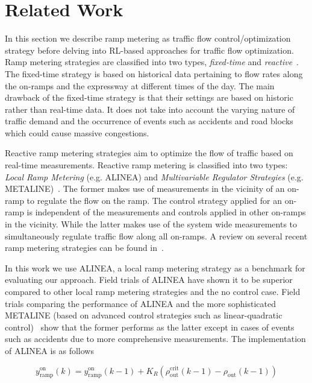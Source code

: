 \documentclass[conference]{IEEEtran}
\begin{document}
\section{Related Work}
\label{sec:rel-work}

In this section we describe ramp metering as traffic flow control/optimization strategy before delving into RL-based approaches for traffic flow optimization. Ramp metering strategies are classified into two types, {\it fixed-time} and {\it reactive}~\cite{papageorgiou2003review}. The fixed-time strategy is based on historical data pertaining to flow rates along the on-ramps and the expressway at different times of the day. The main drawback of the fixed-time strategy is that their settings are based on historic rather than real-time data. It does not take into account the varying nature of traffic demand and the occurrence of events such as accidents and road blocks which could cause massive congestions. 

Reactive ramp metering strategies aim to optimize the flow of traffic based on real-time measurements. Reactive ramp metering is classified into two types: {\it Local Ramp Metering} (e.g. ALINEA) and {\it Multivariable Regulator Strategies} (e.g. METALINE)~\cite{papageorgiou2003review}. The former makes use of measurements in the vicinity of an on-ramp to regulate the flow on the ramp. The control strategy applied for an on-ramp is independent of the measurements and controls applied in other on-ramps in the vicinity. While the latter makes use of the system wide measurements to simultaneously regulate traffic flow along all on-ramps. A review on several recent ramp metering strategies can be found in~\cite{shaaban2016literature}.

In this work we use ALINEA, a local ramp metering strategy as a benchmark for evaluating our approach. Field trials of ALINEA have shown it to be superior compared to other local ramp metering strategies and the no control case. Field trials comparing the performance of ALINEA and the more sophisticated METALINE (based on advanced control strategies such as linear-quadratic control)~\cite{papageorgiou1997alinea} show that the former performs as the latter except in cases of events such as accidents due to more comprehensive measurements. The implementation of ALINEA is as follows

\begin{equation}
\label{eq:alinea}
y^{\text{on}}_{\text{ramp}}(k)=y^{\text{on}}_{\text{ramp}}(k-1)+K_{R}(\rho_{\text{out}}^{\text{crit}}(k-1)-\rho_{\text{out}}(k-1))
\end{equation}
\end{document}
